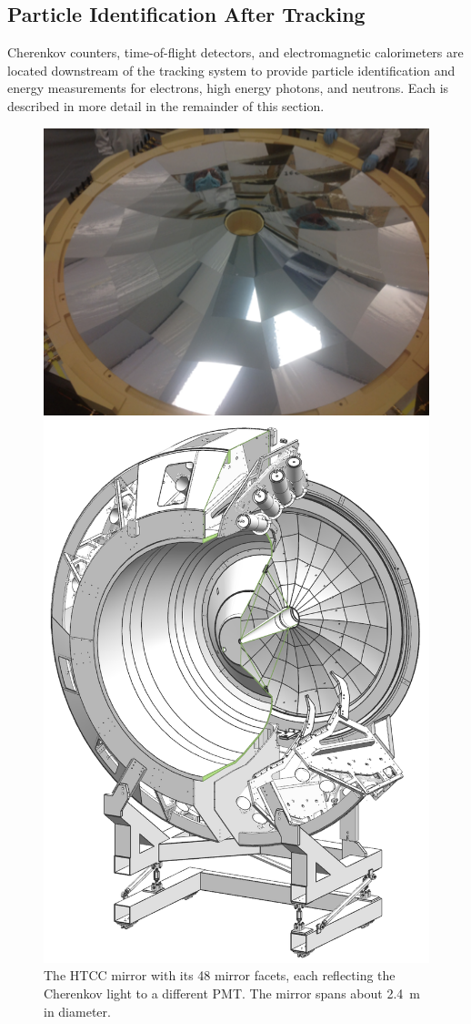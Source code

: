 \documentclass[final,3p,twocolumn]{elsarticle}
\begin{document}
\subsection{Particle Identification After Tracking}

Cherenkov counters, time-of-flight detectors, and electromagnetic calorimeters are located downstream of the
tracking system to provide particle identification and energy measurements for electrons, high energy photons,
and neutrons.  Each is described in more detail in the remainder of this section.

\begin{figure}[htbp!]
\centerline{\includegraphics[angle=90,width=0.75\columnwidth]{HTCC-mirror.png}}
\caption{The HTCC mirror with its 48 mirror facets, each reflecting the Cherenkov light to a different PMT. The
  mirror spans about 2.4~m in diameter.}
\label{htcc}
\centerline{\includegraphics[width=0.9\columnwidth]{htcc-view-3.png}}

\end{figure}
\end{document}

